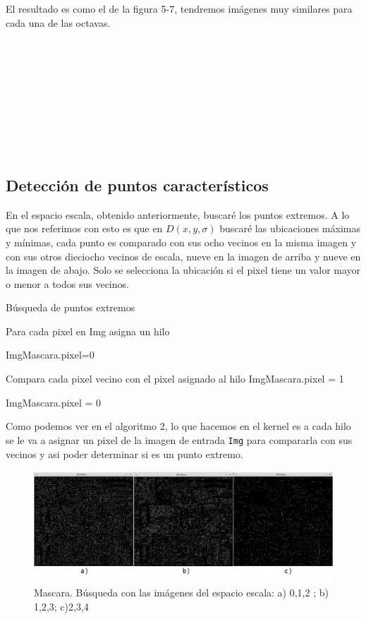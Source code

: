 El resultado es como el de la figura 5-7, tendremos imágenes muy similares para cada una de las octavas. 
\\\\\\\\\\\\\\\\\\\\


\subsection{Detección de puntos característicos}
En el espacio escala, obtenido anteriormente, buscaré los puntos extremos. A lo que nos referimos con esto es que en $D(x,y,\sigma)$ buscaré las ubicaciones máximas y mínimas, cada punto es comparado con sus ocho vecinos en la misma imagen y con sus otros dieciocho vecinos de escala, nueve en la imagen de arriba y nueve en la imagen de abajo. Solo se selecciona la ubicación si el pixel tiene un valor mayor o menor a todos sus vecinos.\\


\begin{algorithm}[H]
\caption{Búsqueda de puntos extremos}
 Para cada pixel en Img asigna un hilo\;
 
 {
	{
		ImgMascara.pixel=0\;
	}{
		{
			Compara cada pixel vecino con el pixel asignado al hilo\;
			{
				ImgMascara.pixel = 1\;			
			}{
				ImgMascara.pixel = 0\;
			
			}
		
		}
		
	}
 }
	
\end{algorithm}


Como podemos ver en el algoritmo 2, lo que hacemos en el kernel es a cada hilo se le va a asignar un pixel de la imagen de entrada \texttt{Img} para compararla con sus vecinos y asi poder determinar si es un punto extremo.\\ 
 
\begin{figure}[h]
			\centering
				\includegraphics[scale=0.3]{img/minmaxs.jpg}
			\caption{Mascara.  Búsqueda con las imágenes del espacio escala: a) 0,1,2 ; b) 1,2,3; c)2,3,4  }
\end{figure} 
 
